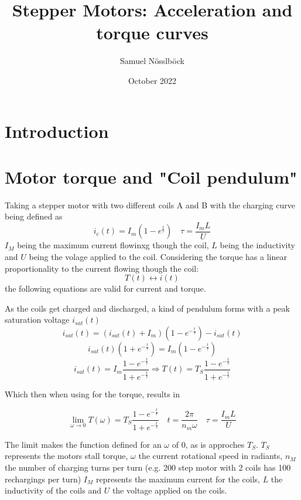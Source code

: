 \documentclass{article}
\title{Stepper Motors: Acceleration and torque curves}
\author{Samuel Nösslböck}
\date{October 2022}
\begin{document}
\maketitle

\section{Introduction}

\section{Motor torque and "Coil pendulum"}

    Taking a stepper motor with two different coils A and B with the charging curve being defined as
    \begin{equation}
        i_c(t) = I_{m} (1 - e^{\frac{t}{\tau}}) \quad \tau = \frac{I_{m}L}{U}
    \end{equation}
    $I_M$ being the maximum current flowinxg though the coil, $L$ being the inductivity and $U$ being the volage applied to the coil.
    Considering the torque has a linear proportionality to the current flowing though the coil:
    \[
        T(t) \leftrightarrow i(t)
    \]
    the following equations are valid for current and torque.

    As the coils get charged and discharged, a kind of pendulum forms with a peak saturation voltage $i_{sat}(t)$
    \[
        i_{sat}(t) = (i_{sat}(t) + I_m)(1 - e^{-\frac{t}{\tau}}) - i_{sat}(t)
    \]\[
        i_{sat}(t)(1 + e^{-\frac{t}{\tau}}) = I_{m}(1 - e^{-\frac{t}{\tau}})
    \]
    \begin{equation}
        i_{sat}(t) = I_m \frac{1 - e^{-\frac{t}{\tau}}}{1 + e^{-\frac{t}{\tau}}} \Rightarrow
        T(t) = T_S \frac{1 - e^{-\frac{t}{\tau}}}{1 + e^{-\frac{t}{\tau}}}
    \end{equation}

    Which then when using for the torque, results in 

    \begin{equation}
        \lim_{\omega \rightarrow 0}
        T(\omega) = T_S \frac{1 - e^{-\frac{t}{\tau}}}{1 + e^{-\frac{t}{\tau}}} \quad 
        t = \frac{2\pi}{n_m\omega} \quad
        \tau = \frac{I_{m}L}{U}
    \end{equation}

    The limit makes the function defined for an $\omega$ of 0, as is approches $T_S$. $T_S$ represents the motors stall torque, 
    $\omega$ the current rotational speed in radiants, $n_M$ the number of charging turns per turn (e.g. 200 step motor with 2 coils has 100 rechargings per turn)
    $I_M$ represents the maximum current for the coils, $L$ the inductivity of the coils and $U$ the voltage applied on the coils.
\end{document}
